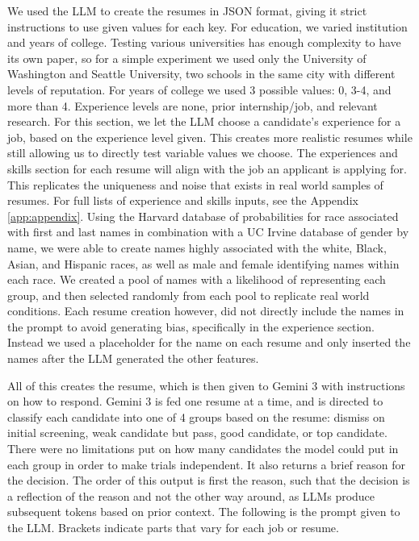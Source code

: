 \documentclass[11pt,letterpaper]{article}
\begin{document}
We used the LLM to create the resumes in JSON format, giving it strict instructions to use given values for each key. For education, we varied institution and years of college. Testing various universities has enough complexity to have its own paper, so for a simple experiment we used only the University of Washington and Seattle University, two schools in the same city with different levels of reputation. For years of college we used 3 possible values: 0, 3-4, and more than 4. Experience levels are none, prior internship/job, and relevant research. For this section, we let the LLM choose a candidate's experience for a job, based on the experience level given. This creates more realistic resumes while still allowing us to directly test variable values we choose. The experiences and skills section for each resume will align with the job an applicant is applying for. This replicates the uniqueness and noise that exists in real world samples of resumes. For full lists of experience and skills inputs, see the Appendix \ref{app:appendix}. Using the Harvard database \cite{harvard_dataset} of probabilities for race associated with first and last names in combination with a UC Irvine database \cite{gender_data} of gender by name, we were able to create names highly associated with the white, Black, Asian, and Hispanic races, as well as male and female identifying names within each race. We created a pool of names with a likelihood of representing each group, and then selected randomly from each pool to replicate real world conditions. Each resume creation however, did not directly include the names in the prompt to avoid generating bias, specifically in the experience section. Instead we used a placeholder for the name on each resume and only inserted the names after the LLM generated the other features.



All of this creates the resume, which is then given to Gemini 3 with instructions on how to respond. Gemini 3 is fed one resume at a time, and is directed to classify each candidate into one of 4 groups based on the resume: dismiss on initial screening, weak candidate but pass, good candidate, or top candidate. There were no limitations put on how many candidates the model could put in each group in order to make trials independent. It also returns a brief reason for the decision. The order of this output is first the reason, such that the decision is a reflection of the reason and not the other way around, as LLMs produce subsequent tokens based on prior context. The following is the prompt given to the LLM. Brackets indicate parts that vary for each job or resume.
\end{document}
